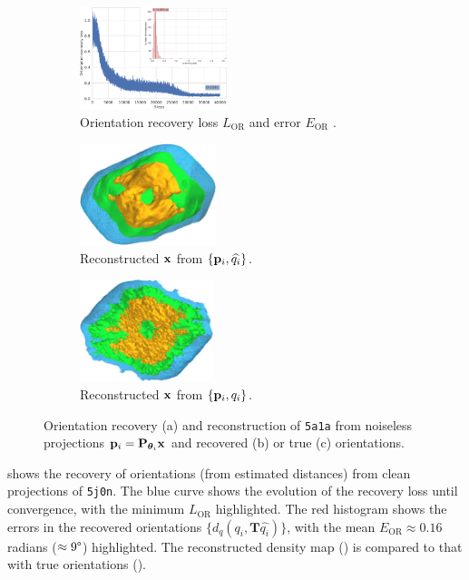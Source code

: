 \begin{figure}[t]
    \centering
    \begin{subfigure}[b]{0.42\textwidth}
        \centering
        \includegraphics[width=\linewidth,height=8em]{figures/5a1a_noise0_ar_aa}
        \caption{%
            Orientation recovery loss $L_\text{OR}$  and error $E_\text{OR}$ .
        }\label{fig:5a1a-noise0-orientation-recovery}
    \end{subfigure}
    \hfill
    \begin{subfigure}[b]{0.27\linewidth}
        \centering
        \includegraphics[height=8em]{figures/5a1a_aligned}
        \caption{Reconstructed $\mathbf{x}$ from $\{ \mathbf{p}_i, \widehat{q_i} \}$.}%
        \label{fig:5a1a-noise0-reconstruction-recovered}
    \end{subfigure}
    \hfill
    \begin{subfigure}[b]{0.27\linewidth}
        \centering
        \includegraphics[height=8em]{figures/5a1a_ground_truth}
        \caption{Reconstructed $\mathbf{x}$ from $\{ \mathbf{p}_i, q_i \}$.}%
        \label{fig:5a1a-noise0-reconstruction-true}
    \end{subfigure}
    \caption{Orientation recovery (a) and reconstruction of \texttt{5a1a} from noiseless projections $\mathbf{p}_i = \mathbf{P}_{{\boldsymbol{\theta}}_i} \mathbf{x}$ and recovered (b) or true (c) orientations.}
\end{figure}

 shows the recovery of orientations (from estimated distances) from clean projections of \texttt{5j0n}.
The blue curve shows the evolution of the recovery loss until convergence, with the minimum $L_\text{OR}$ highlighted.
The red histogram shows the errors in the recovered orientations $\{d_q(q_i, \mathbf{T}\widehat{q_i})\}$, with the mean $E_\text{OR} \approx 0.16$ radians ($\approx 9\degree$) highlighted.
The reconstructed density map () is  compared to that with true orientations ().

